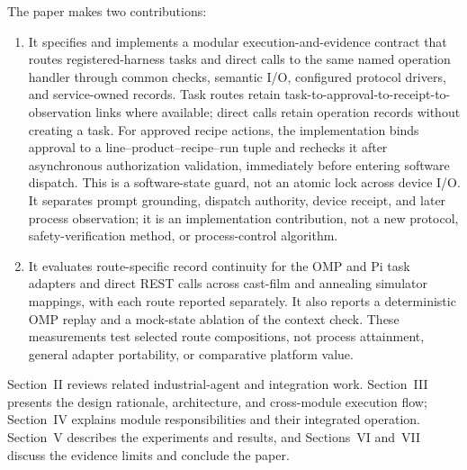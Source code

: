 The paper makes two contributions:
\begin{enumerate}
\item It specifies and implements a modular execution-and-evidence contract
  that routes registered-harness tasks and direct calls to the same named
  operation handler through common checks, semantic I/O, configured protocol
  drivers, and
  service-owned records. Task routes retain task-to-approval-to-receipt-to-
  observation links where available; direct calls retain operation records
  without creating a task. For approved recipe actions, the
  implementation binds approval to a line--product--recipe--run tuple and
  rechecks it after asynchronous authorization validation, immediately before
  entering software dispatch. This is a software-state guard, not an atomic
  lock across device I/O. It
  separates prompt grounding, dispatch authority, device receipt, and later
  process observation; it is an implementation contribution, not a new
  protocol, safety-verification method, or process-control algorithm.
\item It evaluates route-specific record continuity for the OMP and Pi task
  adapters and direct REST calls across cast-film and annealing simulator
  mappings, with each route reported separately. It also reports a
  deterministic OMP replay and a mock-state ablation of the context check.
  These measurements test selected route compositions, not process
  attainment, general adapter portability, or comparative platform value.
\end{enumerate}

Section~II reviews related industrial-agent and integration work.
Section~III presents the design rationale, architecture, and cross-module
execution flow; Section~IV explains module responsibilities and their
integrated operation. Section~V describes the experiments and results, and
Sections~VI and~VII discuss the evidence limits and conclude the paper.
